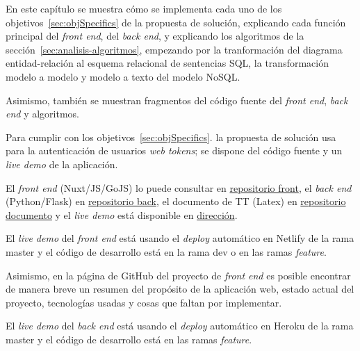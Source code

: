 En este capítulo se muestra cómo se implementa cada uno de los objetivos~\ref{sec:objSpecifics} de la propuesta de solución, explicando cada función principal del \textit{front end}, del \textit{back end}, y explicando los algoritmos de la sección~\ref{sec:analisis-algoritmos}, empezando por la tranformación del diagrama entidad-relación al esquema relacional de sentencias SQL, la transformación modelo a modelo y modelo a texto del modelo NoSQL.

Asimismo, también se muestran fragmentos del código fuente del \textit{front end}, \textit{back end} y algoritmos. 


Para cumplir con los objetivos~\ref{sec:objSpecifics}. la propuesta de solución usa para la autenticación de usuarios \textit{web tokens}; se dispone del código fuente y un \textit{live demo} de la aplicación.


El \textit{front end} (Nuxt/JS/GoJS) lo puede consultar en \href{https://github.com/martinez-acosta/TT-2019-B052}{repositorio front}, el \textit{back end} (Python/Flask) en \href{https://github.com/omaraparicio07/api-tt-2019-b052}{repositorio back}, el documento de TT (Latex) en \href{https://github.com/martinez-acosta/DOCS-TT-2019-B052}{repositorio documento} y el \textit{live demo} está disponible en \href{https://serene-haibt-2239b4.netlify.app/}{dirección}.


El \textit{live demo} del \textit{front end} está usando el \textit{deploy} automático en Netlify de la rama master y el código de desarrollo está en la rama dev o en las ramas \textit{feature}.


Asimismo, en la página de GitHub del proyecto de \textit{front end} es posible encontrar de manera breve un resumen del propósito de la aplicación web, estado actual del proyecto, tecnologías usadas y cosas que faltan por implementar.


El \textit{live demo} del \textit{back end} está usando el \textit{deploy} automático en Heroku de la rama master y el código de desarrollo está en las ramas \textit{feature}.















